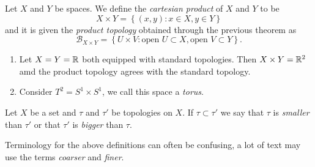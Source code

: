 \begin{definition}
	Let $X$ and $Y$ be spaces.
	We define the \emph{cartesian product} of $X$ and $Y$
	to be
	\[
		X \times Y = \left\{
			(x,y) : x \in X, y \in Y
		\right\}
	\]
	and it is given the \emph{product topology}
	obtained through the previous theorem as
	\[
		\mathcal B_{X \times Y} = \left\{
			U \times V:
			\text{open $U \subset X$},
			\text{open $V \subset Y$}
		\right\}.
	\]
\end{definition}

\begin{examples}
	\begin{enumerate}
		\item 
		Let $X = Y = \mathbb{R}$ both equipped with standard topologies.
		Then $X \times Y = \mathbb{R}^2$ amd the product topology agrees
		with the standard topology.
		
		\item
		Consider $T^2 = S^1 \times S^1$,
		we call this space a \emph{torus}.
	\end{enumerate}
\end{examples}

\begin{definition}[]
	Let $X$ be a set and $\tau$ and $\tau'$ be topologies on $X$.
	If $\tau \subset \tau'$ we say that $\tau$ is \emph{smaller} than
	$\tau'$ or that $\tau'$ is \emph{bigger} than $\tau$.
\end{definition}

Terminology for the above definitions can often be confusing,
a lot of text may use the terms \emph{coarser} and
\emph{finer}.
